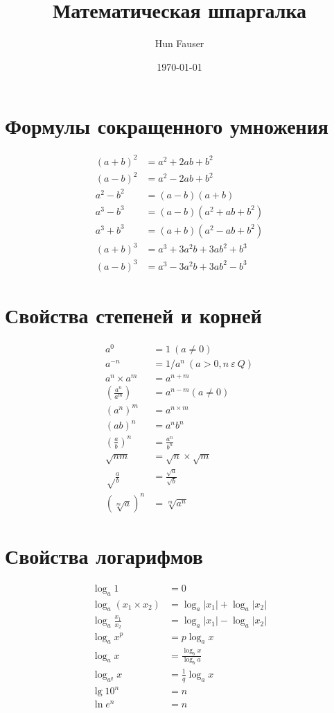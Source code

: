 \documentclass[a4paper,12pt]{article}
\title{Математическая шпаргалка}
\author{Hun Fauser}
\date{\today}
\begin{document}

\maketitle

\section{Формулы сокращенного умножения}

\begin{align*}
(a + b)^2 &= a^2 + 2ab + b^2 \\
(a - b)^2 &= a^2 - 2ab + b^2 \\
a^2 - b^2 &= (a - b)(a + b) \\
a^3 - b^3 &= (a - b)(a^2 + ab + b^2) \\
a^3 + b^3 &= (a + b)(a^2 - ab + b^2) \\
(a + b)^3 &= a^3 + 3a^2b + 3ab^2 + b^3 \\
(a - b)^3 &= a^3 - 3a^2b + 3ab^2 - b^3
\end{align*}

\section{Свойства степеней и корней}

\begin{align*}
a^0 &= 1 ~(a \ne 0) \\
a^{-n} &= 1/a^n ~(a > 0, n ~\varepsilon ~Q) \\
a^n \times a^m &= a^{n + m} \\
\left(\frac{a^n}{a^m}\right) &= a^{n - m} (a \ne 0) \\
(a^n)^m &= a^{n \times m} \\
(ab)^n &= a^nb^n \\
\left(\frac{a}{b}\right)^n &= \frac{a^n}{b^n} \\
\sqrt{nm} &= \sqrt{n} \times \sqrt{m} \\
\sqrt\frac{a}{b} &= \frac{\sqrt{a}}{\sqrt{b}} \\
\left( \sqrt[m]a \right)^n &= \sqrt[m]{a^n}
\end{align*}

\section{Свойства логарифмов}

\begin{align*}
\log_{a}1 &= 0 \\
\log_{a}(x_{1} \times x_{2}) &= \log_{a}|x_{1}| + \log_{a}|x_{2}| \\
\log_{a}\frac{x_{1}}{x_{2}} &= \log_{a}|x_{1}| - \log_{a}|x_{2}| \\
\log_{a}x^p &= p\log_{a}x \\
\log_{a}x &= \frac{\log_{b}x}{\log_{b}a} \\
\log_{a^q}x &= \frac{1}{q}\log_{a}x \\
\lg10^n &= n \\
\ln{e^n} &= n
\end{align*}
\end{document}
